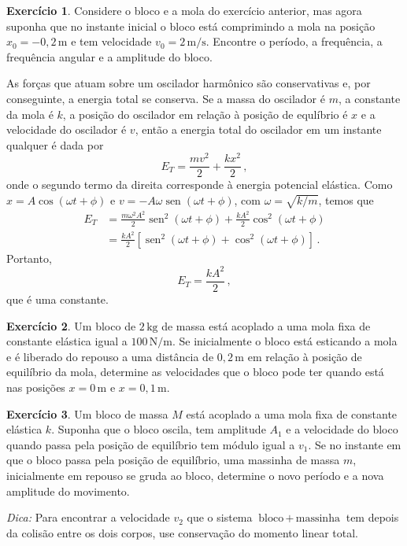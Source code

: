 \documentclass[twocolumn=on,fontsize=12pt,DIV=calc]{scrartcl}
\theoremstyle{definition}
\newtheorem{ex}{Exercício}[section]
\DeclareMathOperator{\sen}{sen}
\begin{document}
\begin{ex}
  Considere o bloco e a mola do exercício anterior, mas agora suponha
  que no instante inicial o bloco está comprimindo a mola na posição
  $x_0=-0{,}2\,\mathrm{m}$ e tem velocidade
  $v_0=2\,\mathrm{m/s}$. Encontre o período, a frequência, a
  frequência angular e a amplitude do bloco.
\end{ex}

As forças que atuam sobre um oscilador harmônico são conservativas e,
por conseguinte, a energia total se conserva. Se a massa do oscilador
é $m$, a constante da mola é $k$, a posição do oscilador em relação à
posição de equlíbrio é $x$ e a velocidade do oscilador é $v$, então a
energia total do oscilador em um instante qualquer é dada por
$$E_T=\frac{mv^2}{2}+\frac{kx^2}{2}\,,$$
onde o segundo termo da direita corresponde à energia potencial
elástica. Como $x=A\cos(\omega t+\phi)$ e
$v=-A\omega\sen(\omega t+\phi)$, com $\omega=\sqrt{k/m}$, temos que
\begin{equation*}
  \begin{split}
    E_T&=\frac{m\omega^2A^2}{2}\sen^2(\omega t+\phi)+\frac{kA^2}{2}\cos^2(\omega t+\phi)\\
    &=\frac{kA^2}{2}[\sen^2(\omega t+\phi)+\cos^2(\omega t+\phi)]\,.
  \end{split}
\end{equation*}
Portanto,
$$E_T=\frac{kA^2}{2}\,,$$
que é uma constante.

\begin{ex}
  Um bloco de $2\,\mathrm{kg}$ de massa está acoplado a uma mola fixa
  de constante elástica igual a $100\,\mathrm{N/m}$. Se inicialmente o
  bloco está esticando a mola e é liberado do repouso a uma distância
  de $0{,}2\,\mathrm{m}$ em relação à posição de equilíbrio da mola,
  determine as velocidades que o bloco pode ter quando está nas
  posições $x=0\,\mathrm{m}$ e $x=0{,}1\,\mathrm{m}$.
\end{ex}

\begin{ex}
  Um bloco de massa $M$ está acoplado a uma mola fixa de constante
  elástica $k$. Suponha que o bloco oscila, tem amplitude $A_1$ e a
  velocidade do bloco quando passa pela posição de equilíbrio tem
  módulo igual a $v_1$. Se no instante em que o bloco passa pela
  posição de equilíbrio, uma massinha de massa $m$, inicialmente em
  repouso se gruda ao bloco, determine o novo período e a nova
  amplitude do movimento.

  \noindent\textit{Dica:} Para encontrar a velocidade $v_2$ que o
  sistema $\text{bloco}\,+\,\text{massinha}$ tem depois da colisão
  entre os dois corpos, use conservação do momento linear total.
\end{ex}
\end{document}
